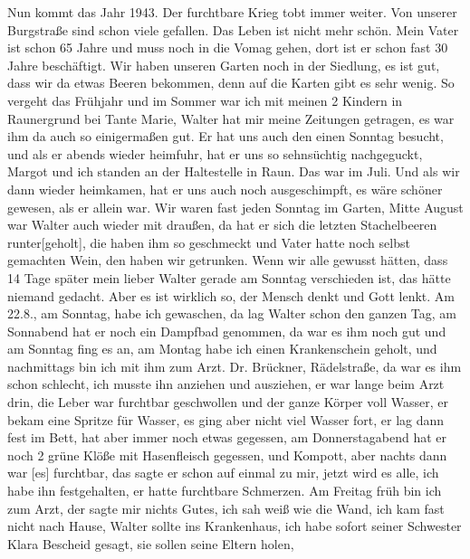 \documentclass[a5paper,11pt,openany]{book}
\newcommand{\seite}[1]{\leavevmode\marginpar{\footnotesize\itshape\raggedright #1}\ignorespaces}
\begin{document}
Nun kommt das Jahr 1943.
Der furchtbare Krieg tobt immer weiter.
Von unserer Burgstraße sind schon viele gefallen.
Das Leben ist nicht mehr schön.
Mein Vater ist schon 65 Jahre und muss noch in die Vomag gehen, dort ist er schon fast 30 Jahre beschäftigt.
Wir haben unseren Garten noch in der Siedlung,
  es ist gut, dass wir da etwas Beeren bekommen, denn auf die Karten gibt es sehr wenig.
So vergeht das Frühjahr
\seite{59}
und im Sommer war ich mit meinen 2 Kindern in Raunergrund bei Tante Marie,
  Walter hat mir meine Zeitungen getragen, es war ihm da auch so einigermaßen gut.
Er hat uns auch den einen Sonntag besucht, und als er abends wieder heimfuhr, hat er uns so sehnsüchtig nachgeguckt,
  Margot und ich standen an der Haltestelle in Raun.
Das war im Juli.
Und als wir dann wieder heimkamen, hat er uns auch noch ausgeschimpft,
  es wäre schöner gewesen, als
\seite{60}
er allein war.
Wir waren fast jeden Sonntag im Garten, Mitte August war Walter auch wieder mit draußen,
  da hat er sich die letzten Stachelbeeren runter[geholt],
  die haben ihm so geschmeckt und Vater hatte noch selbst gemachten Wein,
  den haben wir getrunken.
Wenn wir alle gewusst hätten, dass 14 Tage später mein lieber Walter gerade am Sonntag verschieden ist,
  das hätte niemand gedacht.
Aber es ist wirklich so, der Mensch denkt und Gott lenkt.
Am 22.8., am Sonntag, habe ich gewaschen, da lag Walter schon
\seite{61}
den ganzen Tag, am Sonnabend hat er noch ein Dampfbad genommen,
  da war es ihm noch gut und am Sonntag fing es an,
  am Montag habe ich einen Krankenschein geholt, und nachmittags bin ich mit ihm zum Arzt.
Dr. Brückner, Rädelstraße, da war es ihm schon schlecht,
  ich musste ihn anziehen und ausziehen, er war lange beim Arzt drin,
  die Leber war furchtbar geschwollen und der ganze Körper voll Wasser,
  er bekam eine Spritze für Wasser, es ging aber nicht
\seite{62}
viel Wasser fort, er lag dann fest im Bett, hat aber immer noch etwas gegessen,
  am Donnerstagabend hat er noch 2 grüne Klöße mit Hasenfleisch gegessen, und Kompott,
  aber nachts dann war [es] furchtbar, das sagte er schon auf einmal zu mir, jetzt wird es alle, ich habe ihn festgehalten,
  er hatte furchtbare Schmerzen.
Am Freitag früh bin ich zum Arzt, der sagte mir nichts Gutes,
  ich sah weiß wie die Wand, ich kam fast nicht nach Hause, Walter sollte ins Krankenhaus,
\seite{63}
ich habe sofort seiner Schwester Klara Bescheid gesagt, sie sollen seine Eltern holen,
\end{document}
